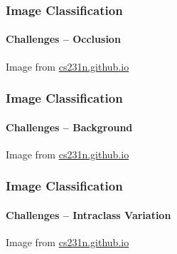 \documentclass[xetex,professionalfont]{beamer}
\begin{document}
\begin{frame}
\frametitle{Image Classification}
\framesubtitle{Challenges -- Occlusion}

\begin{center}
    {\centering Image from \href{http://cs231n.github.io/}{cs231n.github.io}} %
\end{center}

\end{frame}


\begin{frame}
\frametitle{Image Classification}
\framesubtitle{Challenges -- Background}

\begin{center}
    {\centering Image from \href{http://cs231n.github.io/}{cs231n.github.io}} %
\end{center}

\end{frame}


\begin{frame}
\frametitle{Image Classification}
\framesubtitle{Challenges -- Intraclass Variation}

\begin{center}
    {\centering Image from \href{http://cs231n.github.io/}{cs231n.github.io}}
\end{center}

\end{frame}
\end{document}

